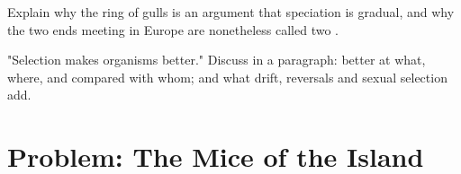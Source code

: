 \begin{exercise}[$\star\star\star$]\label{exo:g12:selection-drift-speciation:14}
Explain why the ring  of gulls is an argument that speciation
is gradual, and why the two ends meeting in Europe are nonetheless
called two .
\end{exercise}

\begin{exercise}[$\star\star\star$]\label{exo:g12:selection-drift-speciation:15}
"Selection makes organisms better." Discuss in a paragraph: better at
what, where, and compared with whom; and what drift, reversals and
sexual selection add.
\end{exercise}

\section{Problem: The Mice of the Island}

